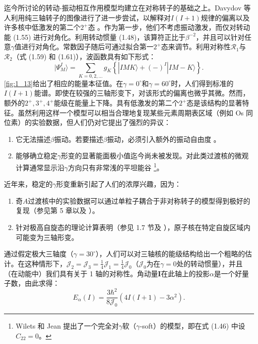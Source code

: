 迄今所讨论的转动-振动相互作用模型均建立在对称转子的基础之上。Davydov 等人利用纯三轴转子的图像进行了进一步尝试，以解释对$I(I+1)$规律的偏离以及许多核中低激发的第二个$2^{+}$态
\cite{DF58,DR59,Da59,Da65b}。作为第一步，他们不考虑振动激发，而仅对转动能 (1.55) 进行对角化。利用转动惯量
(1.48)，该算符正比于$\beta^{-2}$，并且可以针对任意$\gamma$值进行对角化。常数因子随后可通过拟合第一$2^{+}$态来调节。利用对称性$\mathscr{R}_{1}$与$\mathscr{R}_{2}$（式
(1.59) 和 (1.61)），波函数具有如下形式：
\begin{equation}
|\Psi^{I}_{M}\rangle=\sum_{K=0,2,\dots}g_{K}\left\{ |IMK\rangle+(-)^{I}|IM-K\rangle\right\} .\label{eq:1.76}
\end{equation}
\ref{fig:1_13}给出了相应的能量本征值。在$\gamma=0^{\circ}$和$\gamma=60^{\circ}$时，人们得到标准的$I(I+1)$能谱。即使在较强的三轴形变下，对该形式的偏离也微乎其微。然而，额外的$2^{+},3^{+},4^{+}$能级在能量上下降。具有低激发的第二个$2^{+}$态是该结构的显著特征。虽然利用这样一个模型可以相当合理地复现某些元素周期表区域（例如
Os 同位素）的实验数据，但人们仍对它提出了强烈的异议：
\begin{enumerate}
\item 它无法描述$\beta$振动。若要描述$\beta$振动，必须引入额外的振动自由度 \cite{DC60}。
\item 能够确立稳定$\gamma$形变的显著能面极小值迄今尚未被发现。对此类过渡核的微观计算通常显示沿$\gamma$方向只有非常浅的平坦能谷
\cite{KB68,ASS69,GPA72,GG78}\footnote{Wilets 和 Jean \cite{WJ56} 提出了一个完全对$\gamma$软（$\gamma$-soft）的模型，即在式
(1.46) 中设$C_{22}=0$。}。
\end{enumerate}
近年来，稳定的$\gamma$形变重新引起了人们的浓厚兴趣，因为：
\begin{enumerate}
\item 奇$A$过渡核中的实验数据可以通过单粒子耦合于非对称转子的模型得到极好的复现（参见第 5 章以及 \cite{MSD74,Me75,TF75}）。
\item 针对极高自旋态的理论计算表明（参见 1.7 节及 \cite{ALL76}），原子核在特定自旋区域内可能变为三轴形变。
\end{enumerate}
通过假定极大三轴度（$\gamma=30^{\circ}$），人们可以对三轴核的能级结构给出一个粗略的估计。在这种情形下，$\mathcal{J}_{2}=\mathcal{J}_{3}=\frac{1}{4}\mathcal{J}_{1}=\frac{1}{4}\mathcal{J}_{0}$（$\mathcal{J}_{0}$为在$\gamma=0$处的转动惯量），并且（在动能中）我们具有关于
1 轴的对称性。角动量$\boldsymbol{I}$在此轴上的投影$\alpha$是一个好量子数，由此求得：
\begin{equation}
E_{\alpha}(I)=\frac{3\hbar^{2}}{8\mathcal{J}_{0}}(4I(I+1)-3\alpha^{2}).\label{eq:1.77}
\end{equation}

